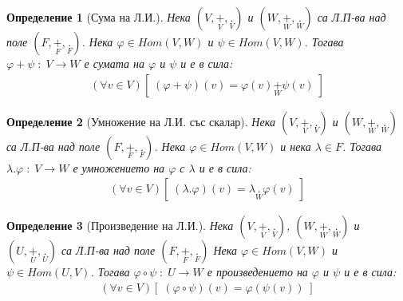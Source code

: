 \documentclass[12pt]{article}
\newtheorem{definition}{Определение}%
\begin{document}
\begin{definition}[Сума на Л.И.]
Нека \((V, \underset{V}{+}, \underset{V}{.})\) и \((W, \underset{W}{+}, \underset{W}{.})\) са Л.П-ва над поле \((F, \underset{F}{+}, \underset{F}{.})\).
Нека \(\varphi \in Hom(V, W)\) и \(\psi \in Hom(V, W)\).
Тогава \(\varphi + \psi \; : \; V \to W\) е сумата на \(\varphi\) и \(\psi\)
и е в сила:
\begin{align*}
(\forall v \in V)[\; (\varphi + \psi)(v) = \varphi(v) \underset{W}{+} \psi(v) \;]
\end{align*}
\end{definition}

\begin{definition}[Умножение на Л.И. със скалар]
Нека \((V, \underset{V}{+}, \underset{V}{.})\) и \((W, \underset{W}{+}, \underset{W}{.})\) са Л.П-ва над поле \((F, \underset{F}{+}, \underset{F}{.})\).
Нека \(\varphi \in Hom(V, W)\) и нека \(\lambda \in F\).
Тогава \(\lambda . \varphi \; : \; V \to W\) е умножението на \(\varphi\) с \(\lambda\)
и е в сила:
\begin{align*}
(\forall v \in V)[\; (\lambda . \varphi)(v) = \lambda \underset{W}{.} \varphi(v) \;]
\end{align*}
\end{definition}

\begin{definition}[Произведение на Л.И.]
Нека \((V, \underset{V}{+}, \underset{V}{.})\),
\((W, \underset{W}{+}, \underset{W}{.})\)
и \((U, \underset{U}{+}, \underset{U}{.})\)
са Л.П-ва над поле \((F, \underset{F}{+}, \underset{F}{.})\)
Нека \(\varphi \in Hom(V, W)\) и \(\psi \in Hom(U, V)\).
Тогава \(\varphi \circ \psi \; : \; U \to W\) е произведението на \(\varphi\) и \(\psi\)
и е в сила:
\begin{align*}
(\forall v \in V)[\; (\varphi \circ \psi)(v) = \varphi(\psi(v)) \;]
\end{align*}
\end{definition}
\end{document}
